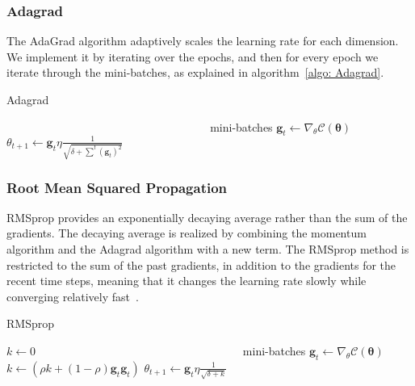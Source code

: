 \documentclass[english,notitlepage,reprint,nofootinbib]{revtex4-2}  %
\begin{document}
\subsubsection*{Adagrad} %
The AdaGrad algorithm adaptively scales the learning rate for each dimension. We implement it by iterating over the epochs, and then for every epoch we iterate through the mini-batches, as explained in algorithm~\ref{algo: Adagrad}. %

\begin{algorithm}[H]
    \caption{Adagrad}\label{algo: Adagrad}
    \begin{algorithmic}
         
        \State $\:\:\:\:\:\:\:\:\:\:\:\:\:\:\:\:\:\:\:\:\:\:\:\:\:\:\:\:\:\:\:\:\:\:\:\:\:\:\:\:\:\:\:\:\:\:\:\:\:\:\:\:\:\:\:\:\:\:\:\:\:\:\:\:\:\:\:\:\:\:\:\:\:\:\:\:\:\:\:\:$ mini-batches
        \State $\mathbf{g}_t \leftarrow \nabla_\theta \mathcal{C}(\boldsymbol{\theta})$ 
        \State $\theta_{t+1} \leftarrow \mathbf{g}_t \eta \frac{1}{\sqrt{\delta+ \sum^t(\mathbf{g}_t)^2}}$
    \end{algorithmic}
\end{algorithm}

\subsubsection*{Root Mean Squared Propagation}
RMSprop provides an exponentially decaying average rather than the sum of the gradients. The decaying average is realized by combining the momentum algorithm and the Adagrad algorithm with a new term. The RMSprop method is restricted to the sum of the past gradients, in addition to the gradients for the recent time steps, meaning that it changes the learning rate slowly while converging relatively fast~\cite{lecture_notes}. 

\begin{algorithm}[H]
    \caption{RMSprop}\label{algo: RMSprop}
    \begin{algorithmic}
         
        \State $k \leftarrow 0$
        \State $\:\:\:\:\:\:\:\:\:\:\:\:\:\:\:\:\:\:\:\:\:\:\:\:\:\:\:\:\:\:\:\:\:\:\:\:\:\:\:\:\:\:\:\:\:\:\:\:\:\:\:\:\:\:\:\:\:\:\:\:\:\:\:\:\:\:\:\:\:\:\:\:\:\:\:\:\:\:\:\:$ mini-batches
        \State $\mathbf{g}_t \leftarrow \nabla_\theta \mathcal{C}(\boldsymbol{\theta})$
        \State $k \leftarrow (\rho k + (1 - \rho)\mathbf{g}_t \mathbf{g}_t)$
        \State $\theta_{t+1} \leftarrow \mathbf{g}_t \eta \frac{1}{\sqrt{\delta + k}}$
    \end{algorithmic}
\end{algorithm}
\end{document}
